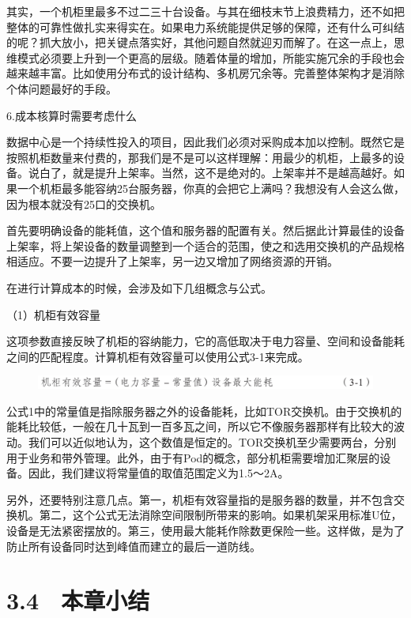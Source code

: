 \documentclass[12pt,UTF8]{ctexbook}
\begin{document}
其实，一个机柜里最多不过二三十台设备。与其在细枝末节上浪费精力，还不如把整体的可靠性做扎实来得实在。如果电力系统能提供足够的保障，还有什么可纠结的呢？抓大放小，把关键点落实好，其他问题自然就迎刃而解了。在这一点上，思维模式必须要上升到一个更高的层级。随着体量的增加，所能实施冗余的手段也会越来越丰富。比如使用分布式的设计结构、多机房冗余等。完善整体架构才是消除个体问题最好的手段。

6.成本核算时需要考虑什么

数据中心是一个持续性投入的项目，因此我们必须对采购成本加以控制。既然它是按照机柜数量来付费的，那我们是不是可以这样理解：用最少的机柜，上最多的设备。说白了，就是提升上架率。当然，这不是绝对的。上架率并不是越高越好。如果一个机柜最多能容纳25台服务器，你真的会把它上满吗？我想没有人会这么做，因为根本就没有25口的交换机。

首先要明确设备的能耗值，这个值和服务器的配置有关。然后据此计算最佳的设备上架率，将上架设备的数量调整到一个适合的范围，使之和选用交换机的产品规格相适应。不要一边提升了上架率，另一边又增加了网络资源的开销。

在进行计算成本的时候，会涉及如下几组概念与公式。

（1）机柜有效容量

这项参数直接反映了机柜的容纳能力，它的高低取决于电力容量、空间和设备能耗之间的匹配程度。计算机柜有效容量可以使用公式3-1来完成。

\begin{figure}[htbp]
	\centering
	\includegraphics[width=1\linewidth]{8}
	\caption{}
	\label{fig:1}
\end{figure}

公式1中的常量值是指除服务器之外的设备能耗，比如TOR交换机。由于交换机的能耗比较低，一般在几十瓦到一百多瓦之间，所以它不像服务器那样有比较大的波动。我们可以近似地认为，这个数值是恒定的。TOR交换机至少需要两台，分别用于业务和带外管理。此外，由于有Pod的概念，部分机柜需要增加汇聚层的设备。因此，我们建议将常量值的取值范围定义为1.5～2A。

另外，还要特别注意几点。第一，机柜有效容量指的是服务器的数量，并不包含交换机。第二，这个公式无法消除空间限制所带来的影响。如果机架采用标准U位，设备是无法紧密摆放的。第三，使用最大能耗作除数更保险一些。这样做，是为了防止所有设备同时达到峰值而建立的最后一道防线。



\section{3.4　本章小结}
\end{document}
